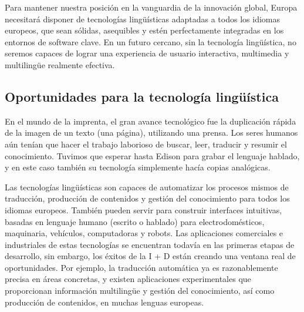 \begin{multicols}{2}

Para mantener nuestra posición en la vanguardia de la innovación global, Europa necesitará disponer de tecnologías lingüísticas adaptadas a todos los idiomas europeos, que sean sólidas, asequibles y estén perfectamente integradas en los entornos de software clave. En un futuro cercano, sin la tecnología lingüística, no seremos capaces de lograr una experiencia de usuario interactiva, multimedia y multilingüe realmente efectiva.

\subsection{Oportunidades para la tecnología lingüística}

En el mundo de la imprenta, el gran avance tecnológico fue la duplicación rápida de la imagen de un texto (una página), utilizando una prensa. Los seres humanos aún tenían que hacer el trabajo laborioso de buscar, leer, traducir y resumir el conocimiento. Tuvimos que esperar hasta Edison para grabar el lenguaje hablado, y en este caso también su tecnología simplemente hacía copias analógicas.

Las tecnologías lingüísticas son capaces de  automatizar los procesos mismos de traducción, producción de contenidos y gestión del conocimiento para todos los idiomas europeos. También pueden servir para construir interfaces intuitivas, basadas en lenguaje humano (escrito o hablado) para electrodomésticos, maquinaria, vehículos, computadoras y robots. Las aplicaciones comerciales e industriales de estas tecnologías se encuentran todavía en las primeras etapas de desarrollo, sin embargo, los éxitos de la I + D están creando una ventana real de oportunidades. Por ejemplo, la traducción automática ya es razonablemente precisa en áreas concretas, y existen aplicaciones experimentales que proporcionan información multilingüe y gestión del conocimiento, así como producción de contenidos, en muchas lenguas europeas.


\end{multicols}
